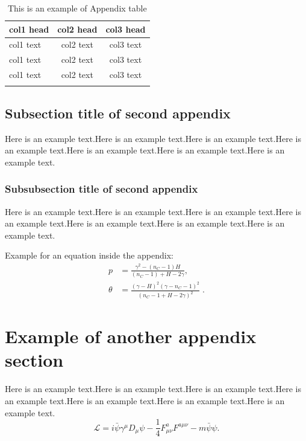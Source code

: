 \documentclass[namedate,webpdf,contemporary,large]{TBench-template}%
\theoremstyle{thmstyleone}%
\theoremstyle{thmstyletwo}%
\theoremstyle{thmstylethree}%
\begin{document}
\begin{appendices}
\begin{table}[t]%
\begin{center}
\begin{minipage}{.52\columnwidth}
\caption{This is an example of Appendix table \label{tab4}}%
\begin{tabular}{@{}lcc@{}}%
\toprule
col1 head & col2 head & col3 head \\
\midrule
col1 text & col2 text & col3 text \\
col1 text & col2 text & col3 text \\
col1 text & col2 text & col3 text \\
\botrule
\end{tabular}
\end{minipage}
\end{center}
\end{table}

\subsection{Subsection title of second appendix}\label{subsec5}

Here is an example text.Here is an example text.Here is an example text.Here is an example text.Here is an example text.Here is an example text.Here is an example text.


\subsubsection{Subsubsection title of second appendix}\label{subsubsec4}

Here is an example text.Here is an example text.Here is an example text.Here is an example text.Here is an example text.Here is an example text.Here is an example text.


Example for an equation inside the appendix:
\begin{align}
 p &= \frac{\gamma^{2} - (n_{C} -1)H}{(n_{C} - 1) + H - 2\gamma}, \label{1eq:hybobo:pfromgH} \\
 \theta &= \frac{(\gamma - H)^{2}(\gamma - n_{C} -1)^{2}}{(n_{C} - 1 + H - 2\gamma)^{2}} \label{2eq:hybobo:tfromgH}\; .
\end{align}

\section{Example of another appendix section}\label{sec13}%

Here is an example text.Here is an example text.Here is an example text.Here is an example text.Here is an example text.Here is an example text.Here is an example text.
\begin{equation}
\mathcal{L} = i \bar{\psi} \gamma^\mu D_\mu \psi
    - \frac{1}{4} F_{\mu\nu}^a F^{a\mu\nu} - m \bar{\psi} \psi.
\label{eq26}
\end{equation}


\end{appendices}
\end{document}
